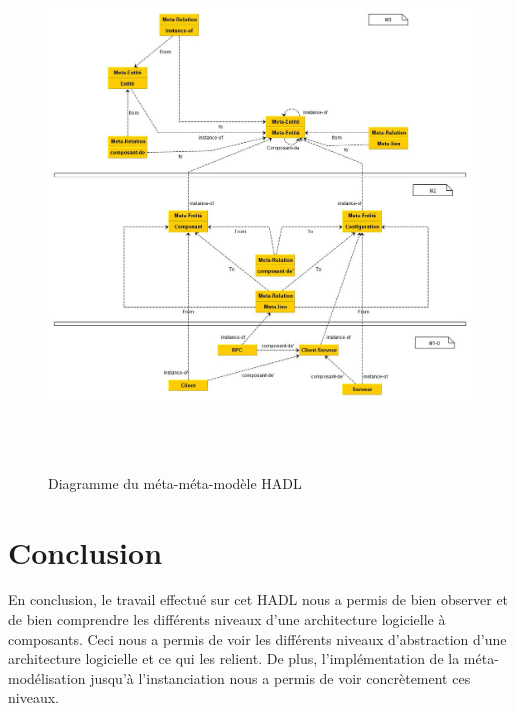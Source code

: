 \documentclass[11pt,a4paper]{article}
\begin{document}
\begin{figure}[h]
  		\centering
  		\includegraphics[height=14cm,width=15cm]{meta-meta-modele.jpg}
  		\caption{Diagramme du méta-méta-modèle HADL}
  		\label{Diagramme du méta-méta-modèle HADL}
\end{figure}


\section{Conclusion}

En conclusion, le travail effectué sur cet HADL nous a permis de bien observer
et de bien comprendre les différents niveaux d'une architecture logicielle à
composants. Ceci nous a permis de voir les différents niveaux d'abstraction
d'une architecture logicielle et ce qui les relient. De plus, l'implémentation
de la méta-modélisation jusqu'à l'instanciation nous a permis de voir
concrètement ces niveaux.
\end{document}
